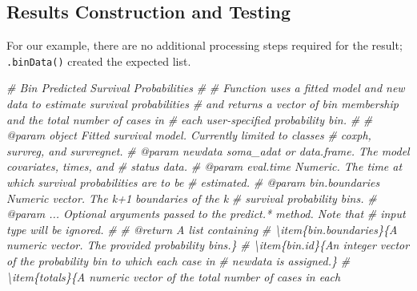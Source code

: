 \documentclass[
]{book}
\newenvironment{Shaded}{\begin{snugshade}}{\end{snugshade}}
\newcommand{\CommentTok}[1]{\textcolor[rgb]{0.56,0.35,0.01}{\textit{#1}}}
\begin{document}
\hypertarget{results-construction-and-testing-1}{%
\subsection{Results Construction and Testing}\label{results-construction-and-testing-1}}

For our example, there are no additional processing steps required for the result; \texttt{.binData()} created the expected list.

\begin{Shaded}
\begin{Highlighting}[]
\CommentTok{\#\textquotesingle{} Bin Predicted Survival Probabilities}
\CommentTok{\#\textquotesingle{} }
\CommentTok{\#\textquotesingle{} Function uses a fitted model and new data to estimate survival probabilities}
\CommentTok{\#\textquotesingle{}   and returns a vector of bin membership and the total number of cases in}
\CommentTok{\#\textquotesingle{}   each user{-}specified probability bin.}
\CommentTok{\#\textquotesingle{}   }
\CommentTok{\#\textquotesingle{} @param object Fitted survival model. Currently limited to classes}
\CommentTok{\#\textquotesingle{}   \textasciigrave{}coxph\textasciigrave{}, \textasciigrave{}survreg\textasciigrave{}, and \textasciigrave{}survregnet\textasciigrave{}.}
\CommentTok{\#\textquotesingle{} @param newdata soma\_adat or data.frame. The model covariates, times, and}
\CommentTok{\#\textquotesingle{}   status data.}
\CommentTok{\#\textquotesingle{} @param eval.time Numeric. The time at which survival probabilities are to be}
\CommentTok{\#\textquotesingle{}   estimated.}
\CommentTok{\#\textquotesingle{} @param bin.boundaries Numeric vector. The k+1 boundaries of the k}
\CommentTok{\#\textquotesingle{}   survival probability bins.}
\CommentTok{\#\textquotesingle{} @param ... Optional arguments passed to the \textasciigrave{}predict.*\textasciigrave{} method. Note that}
\CommentTok{\#\textquotesingle{}   input \textasciigrave{}type\textasciigrave{} will be ignored.}
\CommentTok{\#\textquotesingle{} }
\CommentTok{\#\textquotesingle{} @return A list containing}
\CommentTok{\#\textquotesingle{} \textbackslash{}item\{bin.boundaries\}\{A numeric vector. The provided probability bins.\}}
\CommentTok{\#\textquotesingle{} \textbackslash{}item\{bin.id\}\{An integer vector of the probability bin to which each case in }
\CommentTok{\#\textquotesingle{}   \textasciigrave{}newdata\textasciigrave{} is assigned.\}}
\CommentTok{\#\textquotesingle{} \textbackslash{}item\{totals\}\{A numeric vector of the total number of cases in each }

\end{Highlighting}
\end{Shaded}
\end{document}
